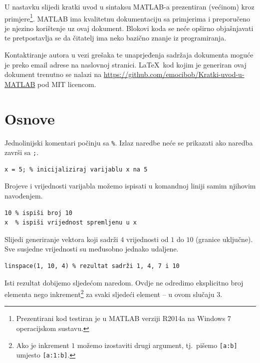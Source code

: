 \documentclass[a4paper, 10pt]{article}
\newcommand{\spec}[1]{\texttt{#1}} %
\begin{document}
U nastavku slijedi kratki uvod u sintaksu MATLAB-a prezentiran (većinom) kroz primjere\footnote{Prezentirani kod testiran je u MATLAB verziji R2014a na Windows 7 operacijskom sustavu.}.
MATLAB ima kvalitetnu dokumentaciju sa primjerima i preporučeno je njezino korištenje uz ovaj dokument.
Blokovi koda se neće opširno objašnjavati te pretpostavlja se da čitatelj ima neko bazično znanje iz programiranja.

Kontaktiranje autora u vezi grešaka te unaprjeđenja sadržaja dokumenta moguće je preko email adrese na naslovnoj stranici.
\LaTeX\ kod kojim je generiran ovaj dokument trenutno se nalazi na \url{https://github.com/emocibob/Kratki-uvod-u-MATLAB} pod MIT licencom.

\clearpage


\section{Osnove}

Jednolinijski komentari počinju sa \spec{\%}.
Izlaz naredbe neće se prikazati ako naredba završi sa \spec{;}.

\begin{lstlisting}
x = 5; % inicijaliziraj varijablu x na 5
\end{lstlisting}

Brojeve i vrijednosti varijabla možemo ispisati u komandnoj liniji samim njihovim navođenjem.

\begin{lstlisting}
10 % ispiši broj 10
x  % ispiši vrijednost spremljenu u x
\end{lstlisting}

Slijedi generiranje vektora koji sadrži $4$ vrijednosti od $1$ do $10$ (granice uključne).
Sve susjedne vrijednosti su međusobno jednako udaljene.

\begin{lstlisting}
linspace(1, 10, 4) % rezultat sadrži 1, 4, 7 i 10
\end{lstlisting}

Isti rezultat dobijemo sljedećom naredom.
Ovdje ne odredimo eksplicitno broj elementa nego inkrement\footnote{Ako je inkrement $1$ možemo izostaviti drugi argument, tj.\ pišemo \spec{[a:b]} umjesto \spec{[a:1:b]}.} za svaki sljedeći element -- u ovom slučaju $3$.
\end{document}
